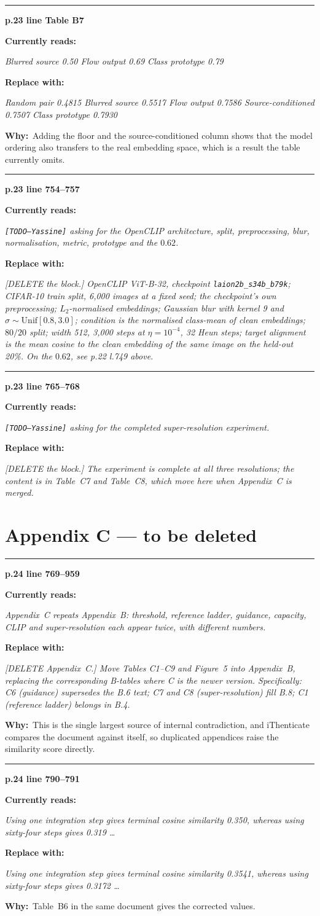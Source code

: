 \documentclass[11pt]{article}
\newcommand{\LOC}[2]{\medskip\noindent\textcolor{hd}{\rule{\textwidth}{0.6pt}}\par
  \noindent\textbf{\large p.#1 \quad line #2}\par\smallskip}
\newcommand{\WRONG}[1]{\noindent\textcolor{bad}{\textbf{Currently reads:}}\par
  \noindent\begingroup\itshape #1\endgroup\par\smallskip}
\newcommand{\RIGHT}[1]{\noindent\textcolor{good}{\textbf{Replace with:}}\par
  \noindent\begingroup\itshape #1\endgroup\par\smallskip}
\newcommand{\WHY}[1]{\noindent\textbf{Why:}\ #1\par}
\begin{document}
\LOC{23}{Table B7}
\WRONG{Blurred source 0.50 \quad Flow output 0.69 \quad Class prototype 0.79}
\RIGHT{Random pair 0.4815 \quad Blurred source 0.5517 \quad Flow output 0.7586 \quad
Source-conditioned 0.7507 \quad Class prototype 0.7930}
\WHY{Adding the floor and the source-conditioned column shows that the model ordering also
transfers to the real embedding space, which is a result the table currently omits.}

\LOC{23}{754--757}
\WRONG{\texttt{[TODO---Yassine]} asking for the OpenCLIP architecture, split, preprocessing, blur,
normalisation, metric, prototype and the $0.62$.}
\RIGHT{[DELETE the block.] OpenCLIP ViT-B-32, checkpoint \texttt{laion2b\_s34b\_b79k}; CIFAR-10
train split, 6{,}000 images at a fixed seed; the checkpoint's own preprocessing; $L_2$-normalised
embeddings; Gaussian blur with kernel 9 and $\sigma\sim\mathrm{Unif}[0.8,3.0]$; condition is the
normalised class-mean of clean embeddings; $80/20$ split; width 512, 3{,}000 steps at
$\eta=10^{-4}$, 32 Heun steps; target alignment is the mean cosine to the clean embedding of the
same image on the held-out 20\%. On the $0.62$, see p.22 l.749 above.}

\LOC{23}{765--768}
\WRONG{\texttt{[TODO---Yassine]} asking for the completed super-resolution experiment.}
\RIGHT{[DELETE the block.] The experiment is complete at all three resolutions; the content is in
Table~C7 and Table~C8, which move here when Appendix~C is merged.}

\section*{Appendix C --- to be deleted}

\LOC{24}{769--959}
\WRONG{Appendix~C repeats Appendix~B: threshold, reference ladder, guidance, capacity, CLIP and
super-resolution each appear twice, with different numbers.}
\RIGHT{[DELETE Appendix~C.] Move Tables C1--C9 and Figure~5 into Appendix~B, replacing the
corresponding B-tables where C is the newer version. Specifically: C6 (guidance) supersedes the
B.6 text; C7 and C8 (super-resolution) fill B.8; C1 (reference ladder) belongs in B.4.}
\WHY{This is the single largest source of internal contradiction, and iThenticate compares the
document against itself, so duplicated appendices raise the similarity score directly.}

\LOC{24}{790--791}
\WRONG{Using one integration step gives terminal cosine similarity 0.350, whereas using sixty-four
steps gives 0.319 \dots}
\RIGHT{Using one integration step gives terminal cosine similarity 0.3541, whereas using
sixty-four steps gives 0.3172 \dots}
\WHY{Table~B6 in the same document gives the corrected values.}
\end{document}
